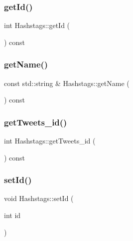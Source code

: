 \subsubsection{\texorpdfstring{get\+Id()}{getId()}}
{\footnotesize\ttfamily int Hashstags\+::get\+Id (\begin{DoxyParamCaption}{ }\end{DoxyParamCaption}) const}

\mbox{\label{class_hashstags_a3da6626a13466e74959f06cd6d253460}} 
\subsubsection{\texorpdfstring{get\+Name()}{getName()}}
{\footnotesize\ttfamily const std\+::string \& Hashstags\+::get\+Name (\begin{DoxyParamCaption}{ }\end{DoxyParamCaption}) const}

\mbox{\label{class_hashstags_a2c9009162ccedb528404f0d1be60c994}} 
\subsubsection{\texorpdfstring{get\+Tweets\+\_\+id()}{getTweets\_id()}}
{\footnotesize\ttfamily int Hashstags\+::get\+Tweets\+\_\+id (\begin{DoxyParamCaption}{ }\end{DoxyParamCaption}) const}

\mbox{\label{class_hashstags_a87ba5f3b5ac660cc77da89cf031937b7}} 
\subsubsection{\texorpdfstring{set\+Id()}{setId()}}
{\footnotesize\ttfamily void Hashstags\+::set\+Id (\begin{DoxyParamCaption}\item[{int}]{id }\end{DoxyParamCaption})}

